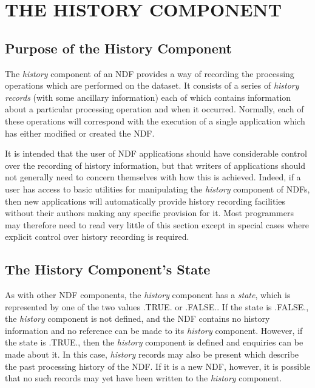 \documentclass[twoside,11pt,nolof]{starlink}
\providecommand{\st}[1]{{\emph{#1}}}
\begin{document}
\section{\label{ss:history}THE HISTORY COMPONENT}

\subsection{Purpose of the History Component}

The \st{history\/} component of an NDF provides a way of recording the
processing operations which are performed on the dataset.  It consists
of a series of \st{history records\/} (with some ancillary information)
each of which contains information about a particular processing
operation and when it occurred.  Normally, each of these operations
will correspond with the execution of a single application which has
either modified or created the NDF.

It is intended that the user of NDF applications should have
considerable control over the recording of history information, but
that writers of applications should not generally need to concern
themselves with how this is achieved.  Indeed, if a user has access to
basic utilities for manipulating the \st{history\/} component of NDFs,
then new applications will automatically provide history recording
facilities without their authors making any specific provision for it.
Most programmers may therefore need to read very little of this
section except in special cases where explicit control over history
recording is required.

\subsection{The History Component's State}

As with other NDF components, the \st{history\/} component has a
\st{state}, which is represented by one of the two values .TRUE. or
.FALSE..  If the state is .FALSE., the \st{history\/} component is not
defined, and the NDF contains no history information and no reference
can be made to its \st{history\/} component. However, if the state is
.TRUE., then the \st{history\/} component is defined and enquiries can
be made about it. In this case, \st{history\/} records may also be present
which describe the past processing history of the NDF. If it is a new
NDF, however, it is possible that no such records may yet have been
written to the \st{history\/} component.
\end{document}
